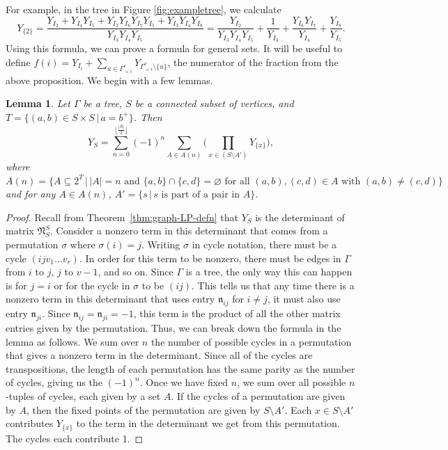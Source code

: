 \documentclass[pdftex]{sigma}
\numberwithin{equation}{section}
\newtheorem{Lemma}[Theorem]{Lemma}
\begin{document}
For example, in the tree in Figure \ref{fig:exampletree}, we calculate
\[
Y_{\{2\}} = \frac{Y_{I_2} + Y_{I_4}Y_{I_5} + Y_{I_3}Y_{I_6}Y_{I_7}Y_{I_5} + Y_{I_3}Y_{I_4}Y_{I_8}}{Y_{I_3}Y_{I_4}Y_{I_5}} = \frac{Y_{I_2}}{Y_{I_3}Y_{I_4}Y_{I_5}} + \frac{1}{Y_{I_3}} + \frac{Y_{I_6}Y_{I_7}}{Y_{I_4}} + \frac{Y_{I_8}}{Y_{I_5}}.
\]
Using this formula, we can prove a formula for general sets. It will be useful to define $f(i)=Y_{I_i}+\sum_{u\in\Gamma_{\lessdot i}^v}Y_{\Gamma_{< i}^v\setminus\{u\}}$, the numerator of the fraction from the above proposition. We begin with a few lemmas.
\begin{Lemma}\label{lem:Y-sum}
Let $\Gamma$ be a tree, $S$ be a connected subset of vertices, and $T=\{(a,b)\in S\times S\, |\, a=b^+\}$. Then
\[ Y_S=\sum_{n=0}^{\big\lfloor\frac{|S|}{2}\big\rfloor}(-1)^n\sum_{A\in A(n)}\bigg(\prod_{x\in (S\setminus A')}Y_{\{x\}}\bigg),\]
where $A(n)=\{A\subseteq 2^T\, |\, |A|=n\text{ and }\{a,b\}\cap\{c,d\}=\varnothing\text{ for all }(a,b),(c,d)\in A\text{ with }(a,b)\neq(c,d)\}$ and for any $A\in A(n)$, $A'=\{s\, |\, s\text{ is part of a pair in }A\}$.
\end{Lemma}
\begin{proof}
Recall from Theorem~\ref{thm:graph-LP-defn} that $Y_S$ is the determinant of matrix $\mathfrak{N}_S^S$. Consider a nonzero term in this determinant that comes from a permutation $\sigma$ where $\sigma(i)=j$. Writing $\sigma$ in cycle notation, there must be a cycle $(ijv_1\dots v_r)$. In order for this term to be nonzero, there must be edges in $\Gamma$ from $i$ to $j$, $j$ to $v-1$, and so on. Since $\Gamma$ is a tree, the only way this can happen is for $j=i$ or for the cycle in $\sigma$ to be $(ij)$. This tells us that any time there is a nonzero term in this determinant that uses entry $\mathfrak{n}_{ij}$ for $i\neq j$, it must also use entry $\mathfrak{n}_{ji}$. Since $\mathfrak{n}_{ij}=\mathfrak{n}_{ji}=-1$, this term is the product of all the other matrix entries given by the permutation.
Thus, we can break down the formula in the lemma as follows. We sum over $n$ the number of possible cycles in a permutation that gives a nonzero term in the determinant. Since all of the cycles are transpositions, the length of each permutation has the same parity as the number of cycles, giving us the $(-1)^n$. Once we have fixed $n$, we sum over all possible $n$-tuples of cycles, each given by a set $A$. If the cycles of a permutation are given by $A$, then the fixed points of the permutation are given by $S\setminus A'$. Each $x\in S\setminus A'$ contributes $Y_{\{x\}}$ to the term in the determinant we get from this permutation. The cycles each contribute 1.
\end{proof}
\end{document}
